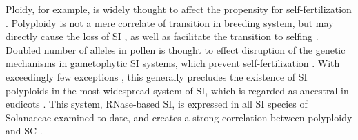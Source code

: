 Ploidy, for example, is widely thought to affect the propensity for self-fertilization \citep{stebbins1950}. 
Polyploidy is not a mere correlate of transition in breeding system, but may directly cause the loss of SI \citep{stout1942, lewis1947}, as well as facilitate the transition to selfing \citep{barringer2007, barrett2008, husband2008}.
Doubled number of alleles in pollen is thought to effect disruption of the genetic mechanisms in gametophytic SI systems, which prevent self-fertilization \citep{entani1999, tsukamoto2005, kubo2010}. 
With exceedingly few exceptions \citep{hauck_2002,nunes_2006}, this generally precludes the existence of SI polyploids in the most widespread system of SI, which is regarded as ancestral in eudicots \citep{igic_2001,steinbachs_2002}.
This system, RNase-based SI, is expressed in all SI species of Solanaceae examined to date, and creates a strong correlation between polyploidy and SC \citep{robertson_2011}.

